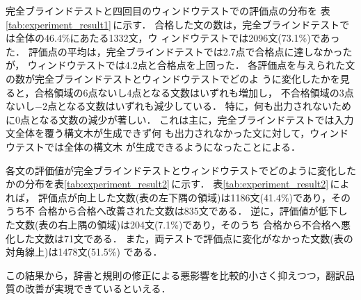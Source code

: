 完全ブラインドテストと四回目のウィンドウテストでの評価点の分布を
表\ref{tab:experiment_result1}\,に示す．
合格した文の数は，完全ブラインドテストでは全体の46.4\%にあたる1332文，ウ
ィンドウテストでは2096文(73.1\%)であった．
評価点の平均は，完全ブラインドテストでは2.7点で合格点に達しなかったが，
ウィンドウテストでは4.2点と合格点を上回った．
各評価点を与えられた文の数が完全ブラインドテストとウィンドウテストでどのよ
うに変化したかを見ると，合格領域の6点ないし4点となる文数はいずれも増加し，
不合格領域の3点ないし$-2$点となる文数はいずれも減少している．
特に，何も出力されないために0点となる文数の減少が著しい．
これは主に，完全ブラインドテストでは入力文全体を覆う構文木が生成できず何
も出力されなかった文に対して，ウィンドウテストでは全体の構文木
が生成できるようになったことによる．

各文の評価値が完全ブラインドテストとウィンドウテストでどのように変化した
かの分布を表\ref{tab:experiment_result2}\,に示す．
表\ref{tab:experiment_result2}\,によれば，
評価点が向上した文数(表の左下隅の領域)は1186文(41.4\%)であり，そのうち不
合格から合格へ改善された文数は835文である．
逆に，評価値が低下した文数(表の右上隅の領域)は204文(7.1\%)であり，そのうち
合格から不合格へ悪化した文数は71文である．
また，両テストで評価点に変化がなかった文数(表の対角線上)は1478文(51.5\%)
である．

この結果から，辞書と規則の修正による悪影響を比較的小さく抑えつつ，翻訳品
質の改善が実現できているといえる．

